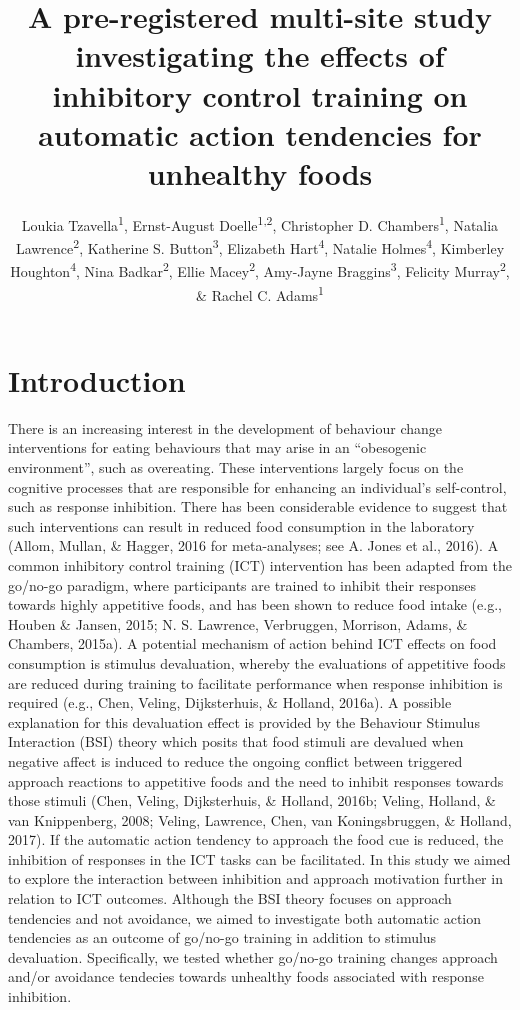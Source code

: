 \documentclass[man,floatsintext]{apa6}
\title{A pre-registered multi-site study investigating the effects of
inhibitory control training on automatic action tendencies for unhealthy
foods}
\author{Loukia Tzavella\textsuperscript{1}, Ernst-August
Doelle\textsuperscript{1,2}, Christopher D. Chambers\textsuperscript{1},
Natalia Lawrence\textsuperscript{2}, Katherine S.
Button\textsuperscript{3}, Elizabeth Hart\textsuperscript{4}, Natalie
Holmes\textsuperscript{4}, Kimberley Houghton\textsuperscript{4}, Nina
Badkar\textsuperscript{2}, Ellie Macey\textsuperscript{2}, Amy-Jayne
Braggins\textsuperscript{3}, Felicity Murray\textsuperscript{2}, \&
Rachel C. Adams\textsuperscript{1}}
\date{}
\affiliation{
\vspace{0.5cm}
\textsuperscript{1} Cardiff University Brain Research Imaging Centre, CF24 4HQ, UK\\\textsuperscript{2} School of Psychology, University of Exeter, EX4 4QG, UK\\\textsuperscript{3} Department of Psychology, University of Bath, BS2 7AY, UK\\\textsuperscript{4} School of Psychology, Cardiff University, CF10 3AT, UK}
\begin{document}
\maketitle

\section{Introduction}\label{introduction}

\par

There is an increasing interest in the development of behaviour change
interventions for eating behaviours that may arise in an
\enquote{obesogenic environment}, such as overeating. These
interventions largely focus on the cognitive processes that are
responsible for enhancing an individual's self-control, such as response
inhibition. There has been considerable evidence to suggest that such
interventions can result in reduced food consumption in the laboratory
(Allom, Mullan, \& Hagger, 2016 for meta-analyses; see A. Jones et al.,
2016). A common inhibitory control training (ICT) intervention has been
adapted from the go/no-go paradigm, where participants are trained to
inhibit their responses towards highly appetitive foods, and has been
shown to reduce food intake (e.g., Houben \& Jansen, 2015; N. S.
Lawrence, Verbruggen, Morrison, Adams, \& Chambers, 2015a). A potential
mechanism of action behind ICT effects on food consumption is stimulus
devaluation, whereby the evaluations of appetitive foods are reduced
during training to facilitate performance when response inhibition is
required (e.g., Chen, Veling, Dijksterhuis, \& Holland, 2016a). A
possible explanation for this devaluation effect is provided by the
Behaviour Stimulus Interaction (BSI) theory which posits that food
stimuli are devalued when negative affect is induced to reduce the
ongoing conflict between triggered approach reactions to appetitive
foods and the need to inhibit responses towards those stimuli (Chen,
Veling, Dijksterhuis, \& Holland, 2016b; Veling, Holland, \& van
Knippenberg, 2008; Veling, Lawrence, Chen, van Koningsbruggen, \&
Holland, 2017). If the automatic action tendency to approach the food
cue is reduced, the inhibition of responses in the ICT tasks can be
facilitated. In this study we aimed to explore the interaction between
inhibition and approach motivation further in relation to ICT outcomes.
Although the BSI theory focuses on approach tendencies and not
avoidance, we aimed to investigate both automatic action tendencies as
an outcome of go/no-go training in addition to stimulus devaluation.
Specifically, we tested whether go/no-go training changes approach
and/or avoidance tendecies towards unhealthy foods associated with
response inhibition.
\end{document}
